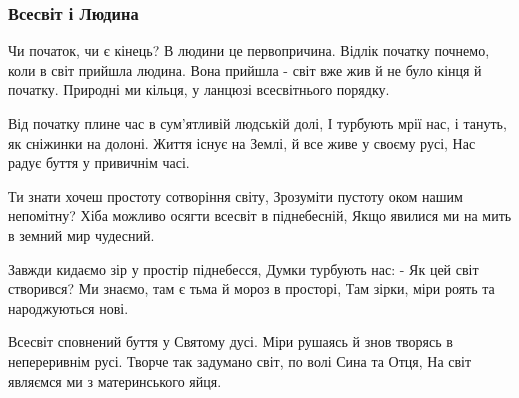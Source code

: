  
 
 

\subsubsection{Всесвіт і Людина}
\label{sec:poetry.rus.sokor.vsesvit_i_ljudyna}

Чи початок, чи є кінець? В людини це первопричина.
Відлік початку почнемо, коли в світ прийшла людина.
Вона прийшла - світ вже жив й не було кінця й початку.
Природні ми кільця, у ланцюзі всесвітнього порядку.

Від початку плине час в сум'ятливій людській долі,
І турбують мрії нас, і тануть, як сніжинки на долоні.
Життя існує на Землі, й все живе у своєму русі,
Нас радує буття у привичнім часі.

Ти знати хочеш простоту сотворіння світу,
Зрозуміти пустоту оком нашим непомітну?
Хіба можливо осягти всесвіт в піднебесній,
Якщо явилися ми на мить в земний мир чудесний.

Завжди кидаємо зір у простір піднебесся,
Думки турбують нас: - Як цей світ створився?
Ми знаємо, там є тьма й мороз в просторі,
Там зірки, міри роять та народжуються нові.

Всесвіт сповнений буття у Святому дусі.
Міри рушаясь й знов творясь в непереривнім русі.
Творче так задумано світ, по волі Сина та Отця,
На світ являємся ми з материнського яйця. 
